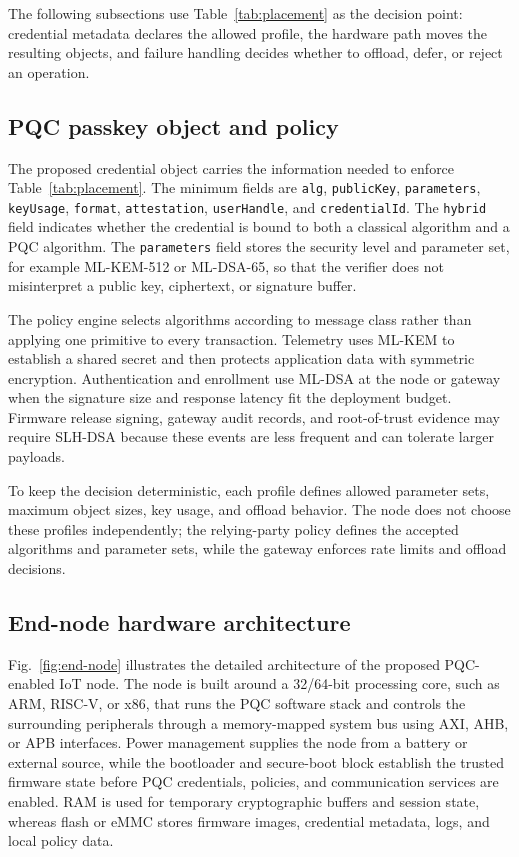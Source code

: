 \documentclass[conference,10pt,letterpaper]{IEEEtran}
\begin{document}
The following subsections use Table~\ref{tab:placement} as the decision point: credential metadata declares the allowed profile, the hardware path moves the resulting objects, and failure handling decides whether to offload, defer, or reject an operation.

\subsection{PQC passkey object and policy}

The proposed credential object carries the information needed to enforce Table~\ref{tab:placement}. The minimum fields are \texttt{alg}, \texttt{publicKey}, \texttt{parameters}, \texttt{keyUsage}, \texttt{format}, \texttt{attestation}, \texttt{userHandle}, and \texttt{credentialId}. The \texttt{hybrid} field indicates whether the credential is bound to both a classical algorithm and a PQC algorithm. The \texttt{parameters} field stores the security level and parameter set, for example ML-KEM-512 or ML-DSA-65, so that the verifier does not misinterpret a public key, ciphertext, or signature buffer.

The policy engine selects algorithms according to message class rather than applying one primitive to every transaction. Telemetry uses ML-KEM to establish a shared secret and then protects application data with symmetric encryption. Authentication and enrollment use ML-DSA at the node or gateway when the signature size and response latency fit the deployment budget. Firmware release signing, gateway audit records, and root-of-trust evidence may require SLH-DSA because these events are less frequent and can tolerate larger payloads.

To keep the decision deterministic, each profile defines allowed parameter sets, maximum object sizes, key usage, and offload behavior. The node does not choose these profiles independently; the relying-party policy defines the accepted algorithms and parameter sets, while the gateway enforces rate limits and offload decisions.

\subsection{End-node hardware architecture}

Fig.~\ref{fig:end-node} illustrates the detailed architecture of the proposed PQC-enabled IoT node. The node is built around a 32/64-bit processing core, such as ARM, RISC-V, or x86, that runs the PQC software stack and controls the surrounding peripherals through a memory-mapped system bus using AXI, AHB, or APB interfaces. Power management supplies the node from a battery or external source, while the bootloader and secure-boot block establish the trusted firmware state before PQC credentials, policies, and communication services are enabled. RAM is used for temporary cryptographic buffers and session state, whereas flash or eMMC stores firmware images, credential metadata, logs, and local policy data.
\end{document}

